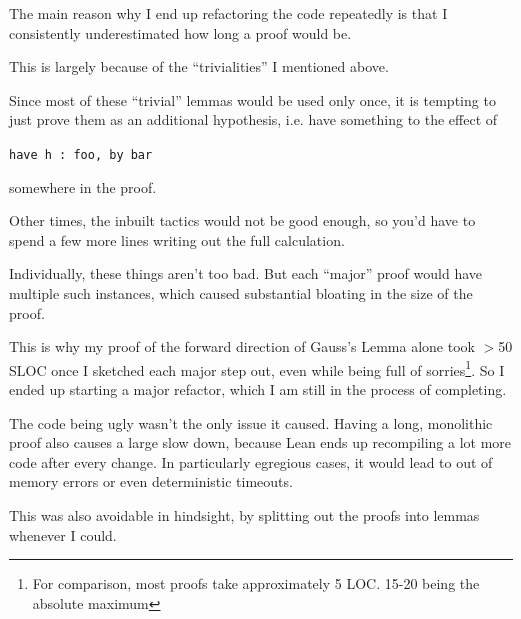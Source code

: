 \documentclass[pagesize=a4]{scrreprt}
\begin{document}
The main reason why I end up refactoring the code repeatedly is that I consistently underestimated how long a proof would be. 

This is largely because of the ``trivialities'' I mentioned above. 

Since most of these ``trivial'' lemmas would be used only once, it is tempting to just prove them as an additional hypothesis, i.e. have something to the effect of 

\begin{center}
    \texttt{have h : foo, by bar}    
\end{center}

 somewhere in the proof. 
 
 Other times, the inbuilt tactics would not be good enough, so you'd have to spend a few more lines writing out the full calculation. 

 Individually, these things aren't too bad. But each ``major'' proof would have multiple such instances, which caused substantial bloating in the size of the proof.
 
 This is why my proof of the forward direction of Gauss's Lemma alone took $>$50 SLOC once I sketched each major step out, even while being full of sorries\footnote{For comparison, most proofs take approximately 5 LOC. 15-20 being the absolute maximum}. So I ended up starting a major refactor, which I am still in the process of completing. 

The code being ugly wasn't the only issue it caused. Having a long, monolithic proof also causes a large slow down, because Lean ends up recompiling a lot more code after every change. In particularly egregious cases, it would lead to out of memory errors or even deterministic timeouts. 

 This was also avoidable in hindsight, by splitting out the proofs into lemmas whenever I could. 
\end{document}
